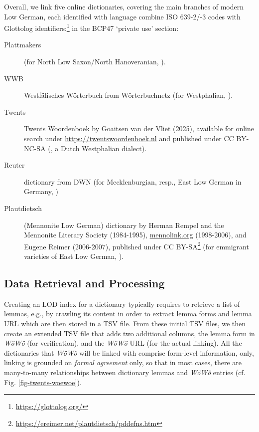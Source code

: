 Overall, we link five online dictionaries, covering the main branches of modern Low German, each identified with language combine ISO 639-2/-3 codes with Glottolog identifiers:\footnote{\url{https://glottolog.org/}} in the BCP47 `private use' section: 

\begin{description}
\item[Plattmakers] (for North Low Saxon/North Hanoveranian, ).
\item[WWB] Westfälisches Wörterbuch from Wörterbuchnetz (for Westphalian, ).
\item[Twents] Twents Woordenboek by Goaitsen van der Vliet (2025), available for online search under \url{https://twentswoordenboek.nl} and published under CC BY-NC-SA (, a Dutch Westphalian dialect).
\item[Reuter] dictionary from DWN (for Mecklenburgian, resp., East Low German in Germany, )
\item[Plautdietsch] (Mennonite Low German) dictionary by Herman Rempel and the Mennonite Literary Society (1984-1995), \url{mennolink.org} (1998-2006), and Eugene Reimer (2006-2007), published under CC BY-SA\footnote{\url{https://ereimer.net/plautdietsch/pddefns.htm}} (for emmigrant varieties of East Low German, ). 
\end{description}

\subsection{Data Retrieval and Processing}

Creating an LOD index for a dictionary typically requires to retrieve a list of lemmas, e.g., by crawling its content in order to extract lemma forms and lemma URL which are then stored in a TSV file. 
From these initial TSV files, we then create an extended TSV file that adds two additional columns, the lemma form in \emph{WöWö} (for verification), and the \emph{WöWö} URL (for the actual linking). All the dictionaries that \emph{WöWö} will be linked with comprise form-level information, only, linking is grounded on \emph{formal agreement} only, so that in most cases, there are many-to-many relationships between dictionary lemmas and \emph{WöWö} entries (cf. Fig. \ref{fig-twents-woewoe}).

